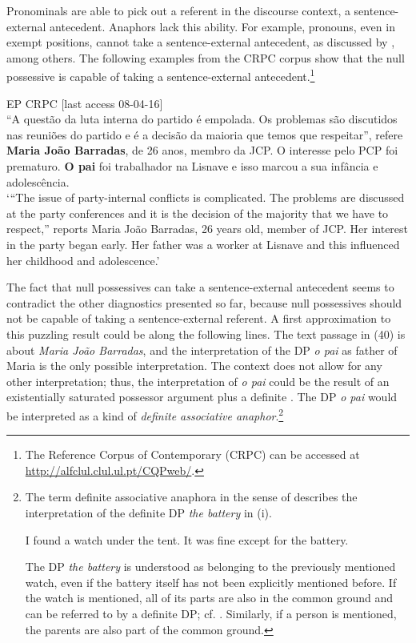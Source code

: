 \documentclass[output=paper]{langsci/langscibook}
\begin{document}
Pronominals are able to pick out a referent in the discourse context, a sentence-external antecedent. Anaphors lack this ability. For example,  pronouns, even in exempt positions, cannot take a sentence-external antecedent, as discussed by \citet{Campos1995}, among others. The following examples from the CRPC corpus show that the null possessive is capable of taking a sentence-external antecedent.\footnote{The Reference Corpus of Contemporary  (CRPC) can be accessed at \url{http://alfclul.clul.ul.pt/CQPweb/}.}

\ea%
    EP   CRPC [last access 08-04-16]\label{ex:wein:40}\\
    “A questão da luta interna do partido é empolada. Os problemas são discutidos nas reuniões do partido e é a decisão da maioria que temos que respeitar”, refere \textbf{Maria João Barradas}, de 26 anos, membro da JCP. O interesse pelo PCP foi prematuro. \textbf{O pai} foi trabalhador na Lisnave e isso marcou a sua infância e adolescência.\\
    \glt ‘“The issue of party-internal conflicts is complicated. The problems are discussed at the party conferences and it is the decision of the majority that we have to respect,” reports Maria João Barradas, 26 years old, member of JCP. Her interest in the party began early. Her father was a worker at Lisnave and this influenced her childhood and adolescence.’
\z

The fact that null possessives can take a sentence-external antecedent seems to contradict the other diagnostics presented so far, because null possessives should not be capable of taking a sentence-external referent. A first approximation to this puzzling result could be along the following lines. The text passage in (40) is about \textit{Maria João Barradas}, and the interpretation of the DP \textit{o pai} as father of Maria is the only possible interpretation. The context does not allow for any other interpretation; thus, the interpretation of \textit{o pai} could be the result of an existentially saturated possessor argument plus a definite . The DP \textit{o pai} would be interpreted as a kind of \textit{definite associative anaphor}.\footnote{The term definite associative anaphora in the sense of \citet{Hawkins1978} describes the interpretation of the definite DP \textit{the battery} in (i).

\ea  I found a watch under the tent. It was fine except for the battery.
\z

The DP \textit{the battery} is understood as belonging to the previously mentioned watch, even if the battery itself has not been explicitly mentioned before. If the watch is mentioned, all of its parts are also in the common ground and can be referred to by a definite DP; cf. \citet{Heim1991}. Similarly, if a person is mentioned, the parents are also part of the common ground.}\textsuperscript{} 
\end{document}
